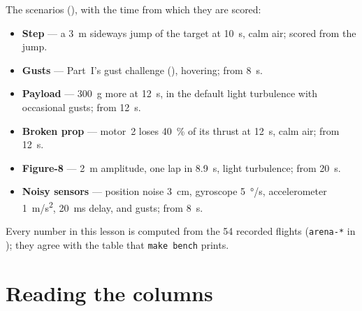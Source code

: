 The scenarios (), with the time from which they are scored:
\begin{itemize}[leftmargin=1.2em]
  \item \textbf{Step} — a \SI{3}{m} sideways jump of the target at \SI{10}{s}, calm air; scored from the jump.
  \item \textbf{Gusts} — Part~I's gust challenge (), hovering; from \SI{8}{s}.
  \item \textbf{Payload} — \SI{300}{g} more at \SI{12}{s}, in the default light turbulence with occasional gusts; from \SI{12}{s}.
  \item \textbf{Broken prop} — motor~2 loses \SI{40}{\%} of its thrust at \SI{12}{s}, calm air; from \SI{12}{s}.
  \item \textbf{Figure-8} — \SI{2}{m} amplitude, one lap in \SI{8.9}{s}, light turbulence; from \SI{20}{s}.
  \item \textbf{Noisy sensors} — position noise \SI{3}{cm}, gyroscope \SI{5}{\degree/s}, accelerometer \SI{1}{m/s^2}, \SI{20}{ms} delay, and gusts; from \SI{8}{s}.
\end{itemize}
Every number in this lesson is computed from the 54 recorded flights (\texttt{arena-*} in ); they agree with the table that \texttt{make bench} prints.


\section{Reading the columns}

